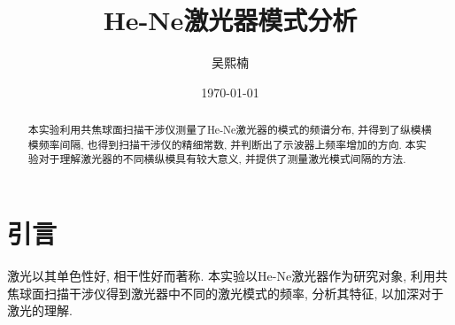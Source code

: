 \documentclass[aps,pre,12pt,preprint,%
	onecolumn,showpacs,showkeys,nofootinbib]{revtex4-2}
\begin{document}
	\title{%
	\texstringonly{\hfil\\[2\baselineskip]}
	\sf\LARGE%
		He-Ne激光器模式分析%
	\texstringonly{\vspace{3ex}}}
	\author{\fangsong\large%
		吴熙楠%
	\vspace{2mm}}
	\date{\today}
	
\begin{abstract}
\vspace{10mm}
\begin{spacing}{1.5}\normalsize
\setlength{\parskip}{.3\baselineskip}
%	
本实验利用共焦球面扫描干涉仪测量了He-Ne激光器的模式的频谱分布, 并得到了纵模横模频率间隔, 也得到扫描干涉仪的精细常数, 并判断出了示波器上频率增加的方向. 本实验对于理解激光器的不同横纵模具有较大意义, 并提供了测量激光模式间隔的方法.
\end{spacing}
\end{abstract}
\clearpage
\maketitle
\thispagestyle{titlepagestyle}
%

\newpage
\section{引言}
激光以其单色性好, 相干性好而著称. 本实验以He-Ne激光器作为研究对象, 利用共焦球面扫描干涉仪得到激光器中不同的激光模式的频率, 分析其特征, 以加深对于激光的理解.
\end{document}
